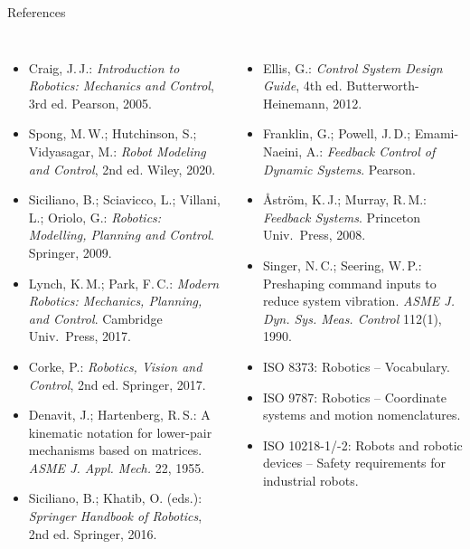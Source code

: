 \documentclass[aspectratio=169,10pt]{beamer}
\begin{document}
\begin{frame}[t]{References}
\fontsize{6}{7}\selectfont\setlength{\itemsep}{0pt}
\begin{columns}[T,onlytextwidth]
\begin{itemize}
\item Craig, J.\,J.: \emph{Introduction to Robotics: Mechanics and Control}, 3rd ed. Pearson, 2005.
\item Spong, M.\,W.; Hutchinson, S.; Vidyasagar, M.: \emph{Robot Modeling and Control}, 2nd ed. Wiley, 2020.
\item Siciliano, B.; Sciavicco, L.; Villani, L.; Oriolo, G.: \emph{Robotics: Modelling, Planning and Control}. Springer, 2009.
\item Lynch, K.\,M.; Park, F.\,C.: \emph{Modern Robotics: Mechanics, Planning, and Control}. Cambridge Univ.\ Press, 2017.
\item Corke, P.: \emph{Robotics, Vision and Control}, 2nd ed. Springer, 2017.
\item Denavit, J.; Hartenberg, R.\,S.: A kinematic notation for lower-pair mechanisms based on matrices. \emph{ASME J. Appl. Mech.} 22, 1955.
\item Siciliano, B.; Khatib, O. (eds.): \emph{Springer Handbook of Robotics}, 2nd ed. Springer, 2016.
\end{itemize}
\begin{itemize}
\item Ellis, G.: \emph{Control System Design Guide}, 4th ed. Butterworth-Heinemann, 2012.
\item Franklin, G.; Powell, J.\,D.; Emami-Naeini, A.: \emph{Feedback Control of Dynamic Systems}. Pearson.
\item Åström, K.\,J.; Murray, R.\,M.: \emph{Feedback Systems}. Princeton Univ.\ Press, 2008.
\item Singer, N.\,C.; Seering, W.\,P.: Preshaping command inputs to reduce system vibration. \emph{ASME J. Dyn. Sys. Meas. Control} 112(1), 1990.
\item ISO 8373: Robotics -- Vocabulary.
\item ISO 9787: Robotics -- Coordinate systems and motion nomenclatures.
\item ISO 10218-1/-2: Robots and robotic devices -- Safety requirements for industrial robots.
\end{itemize}
\end{columns}
\end{frame}
\end{document}
